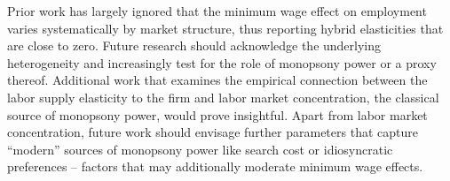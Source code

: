 \documentclass[11pt,oneside,reqno,xcolor=dvipsnames]{article} %
\begin{document}
Prior work has largely ignored that the minimum wage effect on employment varies systematically by market structure, thus reporting hybrid elasticities that are close to zero. Future research should acknowledge the underlying heterogeneity and increasingly test for the role of monopsony power or a proxy thereof. Additional work that examines the empirical connection between the labor supply elasticity to the firm and labor market concentration, the classical source of monopsony power, would prove insightful. Apart from labor market concentration, future work should envisage further parameters that capture ``modern'' sources of monopsony power like search cost or idiosyncratic preferences -- factors that may additionally moderate minimum wage effects.







\clearpage

\printbibliography[heading=bibintoc] %


\clearpage












\end{document}
